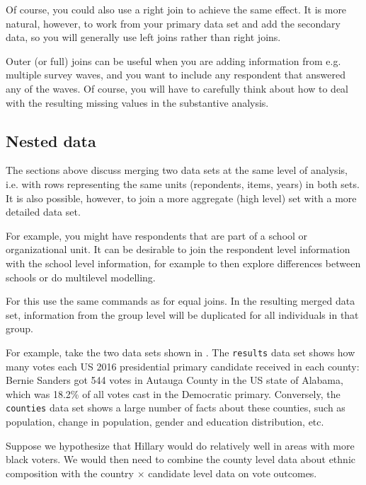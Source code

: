 Of course, you could also use a right join to achieve the same effect.
It is more natural, however, to work from your primary data set and add the secondary data,
so you will generally use left joins rather than right joins.

Outer (or full) joins can be useful when you are adding information from e.g. multiple survey waves,
and you want to include any respondent that answered any of the waves.
Of course, you will have to carefully think about how to deal with the resulting missing values in the substantive analysis. 

\subsection{Nested data}

The sections above discuss merging two data sets at the same level of analysis,
i.e. with rows representing the same units (repondents, items, years) in both sets.
It is also possible, however, to join a more aggregate (high level) set with a more detailed data set.

For example, you might have respondents that are part of a school or organizational unit.
It can be desirable to join the respondent level information with the school level information,
for example to then explore differences between schools or do multilevel modelling.

For this use the same commands as for equal joins.
In the resulting merged data set, information from the group level will be duplicated for all individuals in that group.

For example, take the two data sets shown in .
The \texttt{results} data set shows how many votes each US 2016 presidential primary candidate received in each county:
Bernie Sanders got 544 votes in Autauga County in the US state of Alabama, which was 18.2\% of all votes cast in the
Democratic primary.
Conversely, the \texttt{counties} data set shows a large number of facts about these counties,
such as population, change in population, gender and education distribution, etc. 


Suppose we hypothesize that Hillary would do relatively well in areas with more black voters.
We would then need to combine the county level data about ethnic composition with the country $\times$ candidate
level data on vote outcomes.

